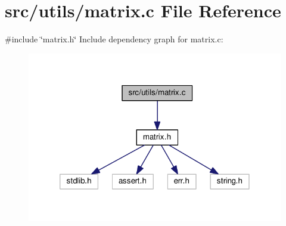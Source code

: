 \section{src/utils/matrix.c File Reference}
\label{matrix_8c}
{\ttfamily \#include \char`\"{}matrix.\+h\char`\"{}}\newline
Include dependency graph for matrix.\+c\+:
\nopagebreak
\begin{figure}[H]
\begin{center}
\leavevmode
\includegraphics[width=320pt]{matrix_8c__incl}
\end{center}
\end{figure}
